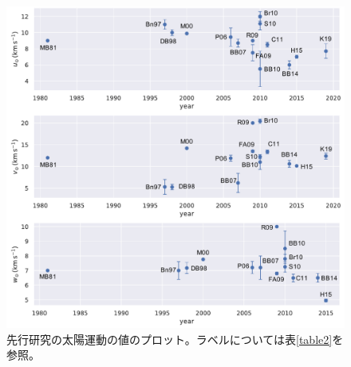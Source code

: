 \begin{figure}[htbp]
	\centering
	\includegraphics[width=13cm]{fig/UVW.pdf}
	\caption{先行研究の太陽運動の値のプロット。ラベルについては表\ref{table2}を参照。}
	\label{fig:uvw}
\end{figure}